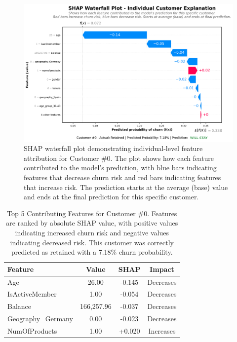 \documentclass[12pt]{article}
\begin{document}
\begin{figure}[H]
\centering
\includegraphics[width=\textwidth]{img/26_shap_waterfall.png}
\caption{SHAP waterfall plot demonstrating individual-level feature attribution for Customer \#0. The plot shows how each feature contributed to the model's prediction, with blue bars indicating features that decrease churn risk and red bars indicating features that increase risk. The prediction starts at the average (base) value and ends at the final prediction for this specific customer.}
\label{fig:shap_waterfall}
\end{figure}

\begin{table}[H]
\centering
\caption{Top 5 Contributing Features for Customer \#0. Features are ranked by absolute SHAP value, with positive values indicating increased churn risk and negative values indicating decreased risk. This customer was correctly predicted as retained with a 7.18\% churn probability.}
\label{tab:shap_top5}
\begin{tabular}{lccc}
\toprule
\textbf{Feature} & \textbf{Value} & \textbf{SHAP} & \textbf{Impact} \\
\midrule
Age & 26.00 & -0.145 & Decreases \\
IsActiveMember & 1.00 & -0.054 & Decreases \\
Balance & 166,257.96 & -0.037 & Decreases \\
Geography\_Germany & 0.00 & -0.023 & Decreases \\
NumOfProducts & 1.00 & +0.020 & Increases \\
\bottomrule
\end{tabular}
\end{table}
\end{document}
